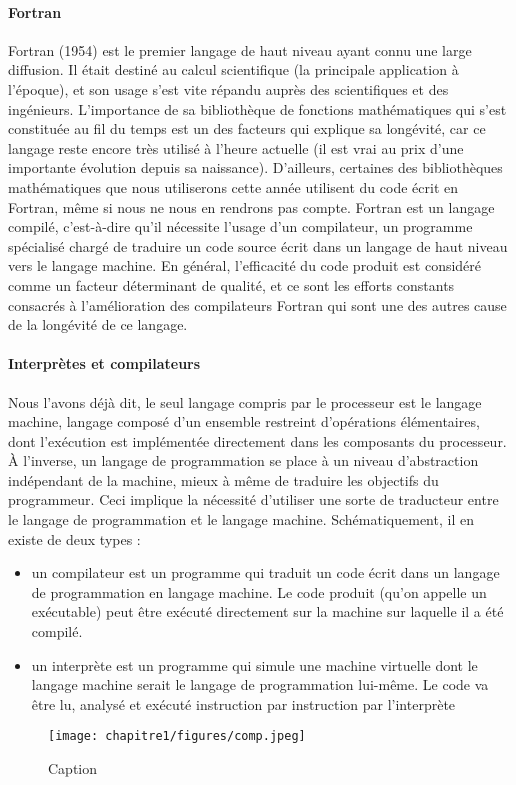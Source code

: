 \paragraph{Fortran}
Fortran (1954) est le premier langage de haut niveau ayant connu une large diffusion. Il était destiné au calcul
scientifique (la principale application à l’époque), et son usage s’est vite répandu auprès des scientifiques et des
ingénieurs. L’importance de sa bibliothèque de fonctions mathématiques qui s’est constituée au fil du temps est
un des facteurs qui explique sa longévité, car ce langage reste encore très utilisé à l’heure actuelle (il est vrai au
prix d’une importante évolution depuis sa naissance). D’ailleurs, certaines des bibliothèques mathématiques
que nous utiliserons cette année utilisent du code écrit en Fortran, même si nous ne nous en rendrons pas
compte.
Fortran est un langage compilé, c’est-à-dire qu’il nécessite l’usage d’un compilateur, un programme spécialisé
chargé de traduire un code source écrit dans un langage de haut niveau vers le langage machine. En général,
l’efficacité du code produit est considéré comme un facteur déterminant de qualité, et ce sont les efforts
constants consacrés à l’amélioration des compilateurs Fortran qui sont une des autres cause de la longévité de
ce langage.

\paragraph{Interprètes et compilateurs}
Nous l’avons déjà dit, le seul langage compris par le processeur est le langage machine, langage composé
d’un ensemble restreint d’opérations élémentaires, dont l’exécution est implémentée directement dans les
composants du processeur. À l’inverse, un langage de programmation se place à un niveau d’abstraction
indépendant de la machine, mieux à même de traduire les objectifs du programmeur. Ceci implique la nécessité
d’utiliser une sorte de traducteur entre le langage de programmation et le langage machine. Schématiquement,
il en existe de deux types :

\begin{itemize}
    \item un compilateur est un programme qui traduit un code écrit dans un langage de programmation en langage
machine. Le code produit (qu’on appelle un exécutable) peut être exécuté directement sur la machine sur
laquelle il a été compilé.
\item un interprète est un programme qui simule une machine virtuelle dont le langage machine serait le
langage de programmation lui-même. Le code va être lu, analysé et exécuté instruction par instruction
par l’interprète
\end{itemize}
\begin{figure}
    \centering
    \texttt{[image: chapitre1/figures/comp.jpeg]}
    \caption{Caption}
    \label{fig:my_label}
\end{figure}


